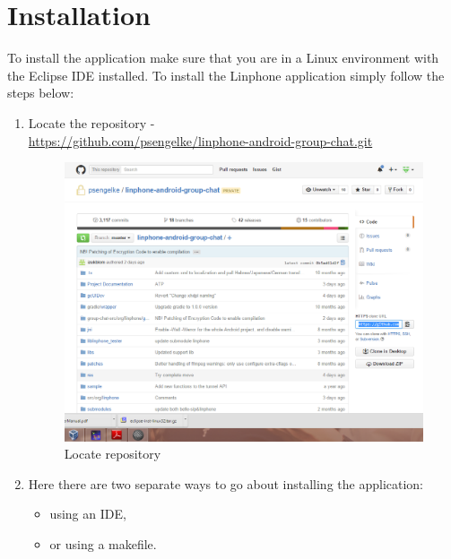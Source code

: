 \documentclass[11pt]{article}
\begin{document}
\section{Installation}
To install the application make sure that you are in a Linux environment with the Eclipse IDE installed.
To install the Linphone application simply follow the steps below:
\begin{enumerate}
\item Locate the repository -  \\ \url{https://github.com/psengelke/linphone-android-group-chat.git}
\begin{figure}[H]
\centering
\includegraphics[width=5in]{./images/repoLocate.png}
\caption{Locate repository}
\label{repoLocate}
\end{figure}
\item Here there are two separate ways to go about installing the application: 
\begin{itemize}
\item using an IDE,
\item or using a makefile. 
\end{itemize}
\end{enumerate}
\end{document}
